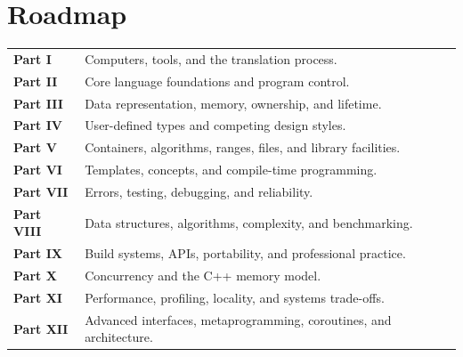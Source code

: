 \chapter*{Roadmap}

\begin{tabularx}{\textwidth}{@{}>{\sffamily\bfseries\color{accent}}lX@{}}
Part I & Computers, tools, and the translation process.\\
Part II & Core language foundations and program control.\\
Part III & Data representation, memory, ownership, and lifetime.\\
Part IV & User-defined types and competing design styles.\\
Part V & Containers, algorithms, ranges, files, and library facilities.\\
Part VI & Templates, concepts, and compile-time programming.\\
Part VII & Errors, testing, debugging, and reliability.\\
Part VIII & Data structures, algorithms, complexity, and benchmarking.\\
Part IX & Build systems, APIs, portability, and professional practice.\\
Part X & Concurrency and the C++ memory model.\\
Part XI & Performance, profiling, locality, and systems trade-offs.\\
Part XII & Advanced interfaces, metaprogramming, coroutines, and architecture.
\end{tabularx}

\clearpage
